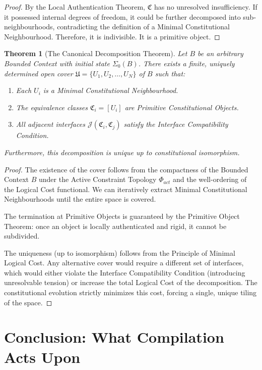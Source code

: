 \documentclass[12pt,openany]{extbook}
\theoremstyle{plain}
\newtheorem{theorem}{Theorem}[chapter]
\theoremstyle{definition}
\begin{document}
\begin{proof}
By the Local Authentication Theorem, $\mathfrak{C}$ has no unresolved insufficiency. If it possessed internal degrees of freedom, it could be further decomposed into sub-neighbourhoods, contradicting the definition of a Minimal Constitutional Neighbourhood. Therefore, it is indivisible. It is a primitive object.
\end{proof}

\begin{theorem}[The Canonical Decomposition Theorem]
Let $B$ be an arbitrary Bounded Context with initial state $\Sigma_0(B)$. There exists a finite, uniquely determined open cover $\mathfrak{U} = \{U_1, U_2, \dots, U_N\}$ of $B$ such that:
\begin{enumerate}
    \item Each $U_i$ is a Minimal Constitutional Neighbourhood.
    \item The equivalence classes $\mathfrak{C}_i = [U_i]$ are Primitive Constitutional Objects.
    \item All adjacent interfaces $\mathcal{J}(\mathfrak{C}_i, \mathfrak{C}_j)$ satisfy the Interface Compatibility Condition.
\end{enumerate}
Furthermore, this decomposition is unique up to constitutional isomorphism.
\end{theorem}

\begin{proof}
The existence of the cover follows from the compactness of the Bounded Context $B$ under the Active Constraint Topology $\Phi_{act}$ and the well-ordering of the Logical Cost functional. We can iteratively extract Minimal Constitutional Neighbourhoods until the entire space is covered. 

The termination at Primitive Objects is guaranteed by the Primitive Object Theorem: once an object is locally authenticated and rigid, it cannot be subdivided. 

The uniqueness (up to isomorphism) follows from the Principle of Minimal Logical Cost. Any alternative cover would require a different set of interfaces, which would either violate the Interface Compatibility Condition (introducing unresolvable tension) or increase the total Logical Cost of the decomposition. The constitutional evolution strictly minimizes this cost, forcing a single, unique tiling of the space.
\end{proof}

\section{Conclusion: What Compilation Acts Upon}
\end{document}
